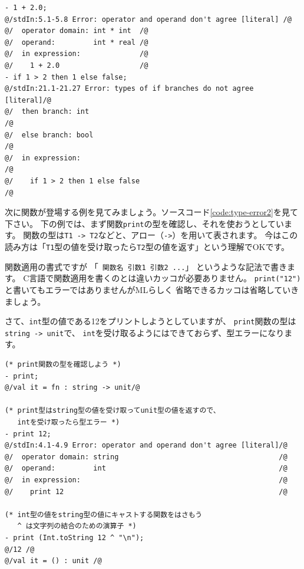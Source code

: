 \documentclass[11pt,a4paper]{article}
\begin{document}
\begin{lstlisting}[label=code:type-error1,caption=型エラー１]
- 1 + 2.0;
@/stdIn:5.1-5.8 Error: operator and operand don't agree [literal] /@
@/  operator domain: int * int  /@
@/  operand:         int * real /@
@/  in expression:              /@
@/    1 + 2.0                   /@
- if 1 > 2 then 1 else false;
@/stdIn:21.1-21.27 Error: types of if branches do not agree [literal]/@
@/  then branch: int                                                 /@
@/  else branch: bool                                                /@
@/  in expression:                                                   /@
@/    if 1 > 2 then 1 else false                                     /@
\end{lstlisting}

次に関数が登場する例を見てみましょう。ソースコード\ref{code:type-error2}を見て下さい。
下の例では、まず関数\lstinline{print}の型を確認し、それを使おうとしています。
関数の型は\lstinline{T1 -> T2}などと、アロー（\lstinline{->}）を用いて表されます。
今はこの読み方は「\lstinline{T1}型の値を受け取ったら\lstinline{T2}型の値を返す」という理解でOKです。

関数適用の書式ですが 「\lstinline{ 関数名 引数1 引数2 ...}」 というような記法で書きます。
C言語で関数適用を書くのとは違いカッコが必要ありません。
\lstinline{print("12")}と書いてもエラーではありませんがMLらしく
省略できるカッコは省略していきましょう。

さて、\lstinline{int}型の値である12をプリントしようとしていますが、
\lstinline{print}関数の型は\lstinline{string -> unit}で、
\lstinline{int}を受け取るようにはできておらず、型エラーになります。

\begin{lstlisting}[caption=型エラー２,label=code:type-error2]
(* print関数の型を確認しよう *)
- print;
@/val it = fn : string -> unit/@

(* print型はstring型の値を受け取ってunit型の値を返すので、
   intを受け取ったら型エラー *)
- print 12;
@/stdIn:4.1-4.9 Error: operator and operand don't agree [literal]/@
@/  operator domain: string                                      /@
@/  operand:         int                                         /@
@/  in expression:                                               /@
@/    print 12                                                   /@

(* int型の値をstring型の値にキャストする関数をはさもう
   ^ は文字列の結合のための演算子 *)
- print (Int.toString 12 ^ "\n");
@/12 /@
@/val it = () : unit /@
\end{lstlisting}
\end{document}
